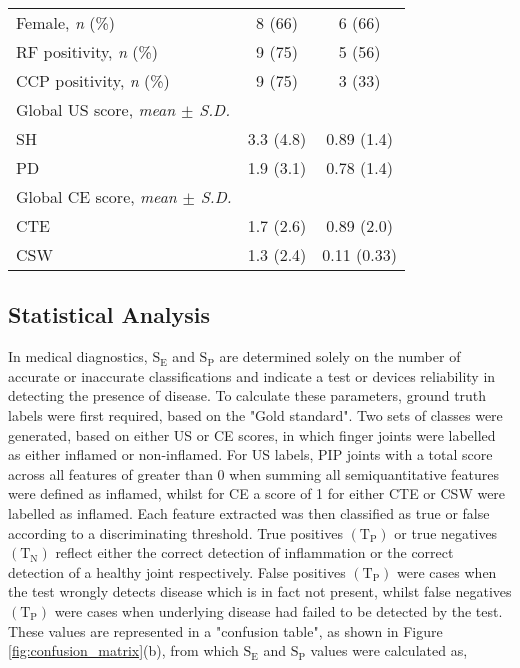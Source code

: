 \documentclass[twoside]{bhamthesis}
\theoremstyle{definition}
\begin{document}
\begin{table}[!ht]
\begin{center}
\begin{tabular}{l c c}
Female, \textit{n} (\%) & 8\hspace{1mm} (66) & 6\hspace{1mm} (66)  \\
RF positivity, \textit{n} (\%)& 9 (75) & 5 (56) \\
CCP positivity, \textit{n} (\%) & 9 (75) & 3 (33)  \\
Global US score, \textit{ mean $\pm$ S.D.} &  & \\
\hspace{3mm} SH & 3.3 (4.8) &  0.89 (1.4) \\
\hspace{3mm} PD & 1.9 (3.1) & 0.78 (1.4) \\
Global CE score, \textit{ mean $\pm$ S.D.} &  &  \\
\hspace{3mm} CTE & 1.7 (2.6) & 0.89 (2.0) \\
\hspace{3mm} CSW & 1.3 (2.4) & 0.11 (0.33) \\
\hline
\end{tabular}
\end{center}
\end{table}
\egroup

\subsection{Statistical Analysis}

In medical diagnostics, $\mathrm{S_E}$ and $\mathrm{S_P}$ are determined solely on the number of accurate or inaccurate classifications and indicate a test or devices reliability in detecting the presence of disease. To calculate these parameters, ground truth labels were first required, based on the "Gold standard". Two sets of classes were generated, based on either US or CE scores, in which finger joints were labelled as either inflamed or non-inflamed. For US labels, PIP joints with a total score across all features of greater than 0 when summing all semiquantitative features were defined as inflamed, whilst for CE a score of 1 for either CTE or CSW were labelled as inflamed. Each feature extracted was then classified as true or false according to a discriminating threshold. True positives $\mathrm{(T_P)}$ or true negatives $\mathrm{(T_N)}$ reflect either the correct detection of inflammation or the correct detection of a healthy joint respectively. False positives $\mathrm{(T_P)}$ were cases when the test wrongly detects disease which is in fact not present, whilst false negatives $\mathrm{(T_P)}$ were cases when underlying disease had failed to be detected by the test. These values are represented in a "confusion table", as shown in Figure \ref{fig:confusion_matrix}(b), from which $\mathrm{S_E}$ and $\mathrm{S_P}$ values were calculated as,
\end{document}
